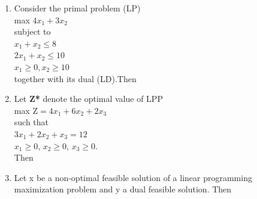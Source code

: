 \documentclass[journal,12pt,twocolumn]{IEEEtran}
\begin{document}
\begin{enumerate}
\item Consider the primal problem (LP) \\
max $4x_1 \! + \! 3x_2$ \\
subject to\\
$x_1 \! + \! x_2 \! \leqslant \! 8$ \\
$2x_1 \! + \! x_2 \! \leqslant \! 10$ \\
$x_1 \! \geqslant \! 0, x_2 \! \geqslant \! 10$ \\
together with its dual (LD).Then 
%
\begin{enumerate}[(A)]
\end{enumerate}
%
\item Let \textbf{Z*} denote the optimal value of LPP \\
max $\text{Z} = 4x_1 \! + \! 6x_2 \! + \! 2x_3$\\
such that \\
$3x_1 \! + \! 2x_2 \! + \! x_3 \! = \! 12$ \\
$x_1 \! \geqslant \! 0$, \! $x_2 \! \geqslant \! 0$, \! $x_3 \! \geqslant \! 0$.\\
\medskip
Then 
\begin{enumerate}[(A)]
\end{enumerate}
%
\item Let x be a non-optimal feasible solution of a linear programming maximization problem and y a dual feasible solution. Then
%
\begin{enumerate}[(A)]
\setlength\itemsep{1em}


\end{enumerate}
\end{enumerate}
\end{document}
